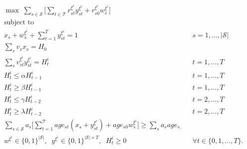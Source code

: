 \documentclass[forests,article,submit,moreauthors,pdftex]{Definitions/mdpi}
\begin{document}
\begingroup
\begin{align}
    & \max \; \sum_{s\in \mathcal{S}} \Bigg[ \sum_{t\in \mathcal{T}} r^{\xi^{i}}_{st}y_{st}^{\xi^{i}}  + r^{\xi^{i}}_{s0} w_s^{\xi^{i}} \Bigg]\label{eq:obj_2_}\\
& \text{subject to} \nonumber\\
    &  x_s + w_s^{\xi^{i}} + \sum_{t=1}^T y_{st}^{\xi^{i}} = 1 &&  s=1,\dots, |\mathcal{S}| \label{eq:one_harvest}\\
    & \sum_s v_s x_s  = H_0 \label{eq:compute_v0}\\
    & \sum_s v_{st}^{\xi^{i}} y_{st}^{\xi^{i}} = H_{t}^{i} &&  t = 1, \dots, T \label{eq:compute_v_others}\\
    & H_t^{i} \le \alpha H_{t-1}^{i} &&   t=1, \dots, T \label{eq:vol_flu_low}\\
    & H_t^{i} \ge \beta H_{t-1}^{i} &&  t=1, \dots, T \label{eq:vol_flu_high}\\
     & H_t^{i} \le \gamma H_{t-2}^{i} &&   t=2, \dots, T \label{eq:vol_flu_low2}\\
    & H_t^{i} \ge \lambda H_{t-2}^{i} &&  t=2, \dots, T \label{eq:vol_flu_high2}\\
    & \sum_{s\in \mathcal{S}}a_s\Bigg[\sum_{t=1}^{\mathcal{T}} age_{st}(x_{s} + y_{st}^{\xi^{i}}) + age_{s0}w_{s}^{\xi^{i}}\Bigg] \ge \sum_s a_s age_{s.} \label{eq:age_end}\\
    & w^{\xi^{i}} \in \{0, 1\}^{|\mathcal{S}|}, \; \; y^{\xi^{i}} \in \{0, 1\}^{|\mathcal{S}| \times T}, \; \; H_{t}^{i} \ge 0 && \forall t \in \{0, 1, \dots, T\}. \label{eq:var_definition}
\end{align}
\endgroup
\end{document}
